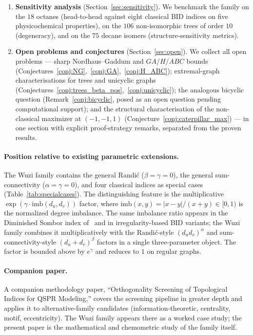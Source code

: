 \documentclass[11pt,a4paper]{article}
\theoremstyle{definition}
\begin{document}
\begin{enumerate}[label=(\arabic*)]
with length-$2$ spokes for odd $n \ge 9$, and the balanced
double-spider with two hubs summing to $n/2 + 1$ for even
$n \ge 10$ (Table~\ref{tab:caterpillar_argmax},
Figure~\ref{fig:caterpillar_maximizers}).
\item \textbf{Sensitivity analysis} (Section~\ref{sec:sensitivity}).
We benchmark the family on the $18$ octanes (head-to-head against
eight classical BID indices on five physicochemical properties),
on the $106$ non-isomorphic trees of order $10$ (degeneracy), and
on the $75$ decane isomers (structure-sensitivity metrics).
\item \textbf{Open problems and conjectures}
(Section~\ref{sec:open}). We collect all open problems --- sharp
Nordhaus--Gaddum and $GA$/$H$/$ABC$ bounds
(Conjectures~\ref{conj:NG},~\ref{conj:GA},~\ref{conj:H_ABC});
extremal-graph characterisations for trees and unicyclic graphs
(Conjectures~\ref{conj:trees_beta_pos},~\ref{conj:unicyclic});
the analogous bicyclic question (Remark~\ref{conj:bicyclic},
posed as an open question pending computational support); and
the structural characterisation of the non-classical maximizer at
$(-1, -1, 1)$ (Conjecture~\ref{conj:caterpillar_max}) --- in one
section with explicit proof-strategy remarks, separated from the
proven results.
\end{enumerate}

\paragraph{Position relative to existing parametric extensions.}
The Wuzi family contains the general Randi\'c
($\beta=\gamma=0$), the general sum-connectivity
($\alpha=\gamma=0$), and four classical indices as special cases
(Table~\ref{tab:specialcases}). The distinguishing feature is the
multiplicative $\exp(\gamma\cdot \mathrm{imb}(d_u,d_v))$ factor,
where $\mathrm{imb}(x,y)=|x-y|/(x+y)\in[0,1)$ is the normalized
degree imbalance. The same imbalance ratio appears in the
Diminished Sombor index of~\cite{MovahediGutmanRedzepovicFurtula2026}
and in irregularity-based BID variants; the Wuzi family combines
it multiplicatively with the Randi\'c-style $(d_u d_v)^\alpha$ and
sum-connectivity-style $(d_u+d_v)^\beta$ factors in a single
three-parameter object. The factor is bounded above by $e^{\gamma}$
and reduces to $1$ on regular graphs.

\paragraph{Companion paper.}
A companion methodology paper, ``Orthogonality Screening of
Topological Indices for QSPR Modeling,'' covers the screening
pipeline in greater depth and applies it to alternative-family
candidates (information-theoretic, centrality, motif, eccentricity).
The Wuzi family appears there as a worked case study; the present
paper is the mathematical and chemometric study of the family
itself.
\end{document}

